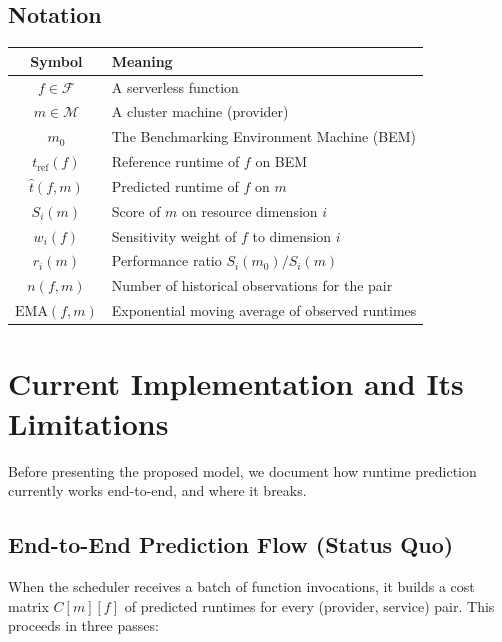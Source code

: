 \documentclass[11pt, a4paper]{article}
\begin{document}
\subsection{Notation}

\begin{center}
\begin{tabular}{cl}
    \toprule
    Symbol & Meaning \\
    \midrule
    $f \in \mathcal{F}$ & A serverless function \\
    $m \in \mathcal{M}$ & A cluster machine (provider) \\
    $m_0$ & The Benchmarking Environment Machine (BEM) \\
    $t_{\mathrm{ref}}(f)$ & Reference runtime of $f$ on BEM \\
    $\hat{t}(f, m)$ & Predicted runtime of $f$ on $m$ \\
    $S_i(m)$ & Score of $m$ on resource dimension $i$ \\
    $w_i(f)$ & Sensitivity weight of $f$ to dimension $i$ \\
    $r_i(m)$ & Performance ratio $S_i(m_0) / S_i(m)$ \\
    $n(f, m)$ & Number of historical observations for the pair \\
    $\mathrm{EMA}(f, m)$ & Exponential moving average of observed runtimes \\
    \bottomrule
\end{tabular}
\end{center}

\section{Current Implementation and Its Limitations}
\label{sec:current}

Before presenting the proposed model, we document how runtime prediction
currently works end-to-end, and where it breaks.

\subsection{End-to-End Prediction Flow (Status Quo)}

When the scheduler receives a batch of function invocations, it builds a cost
matrix $C[m][f]$ of predicted runtimes for every (provider, service) pair.
This proceeds in three passes:
\end{document}
